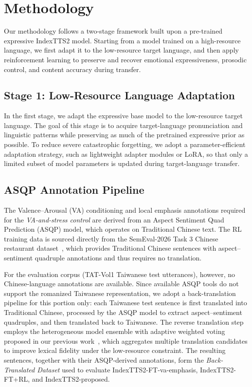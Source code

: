 \section{Methodology}
\label{section:algorithm}

Our methodology follows a two-stage framework built upon a pre-trained expressive IndexTTS2 model. Starting from a model trained on a high-resource language, we first adapt it to the low-resource target language, and then apply reinforcement learning to preserve and recover emotional expressiveness, prosodic control, and content accuracy during transfer.

\subsection{Stage 1: Low-Resource Language Adaptation}
In the first stage, we adapt the expressive base model to the low-resource target language. The goal of this stage is to acquire target-language pronunciation and linguistic patterns while preserving as much of the pretrained expressive prior as possible. To reduce severe catastrophic forgetting, we adopt a parameter-efficient adaptation strategy, such as lightweight adapter modules or LoRA, so that only a limited subset of model parameters is updated during target-language transfer.

\subsection{ASQP Annotation Pipeline}
\label{section:algorithm:backtranslation}
The Valence--Arousal (VA) conditioning and local emphasis annotations required for the \emph{VA-and-stress control} are derived from an Aspect Sentiment Quad Prediction (ASQP) model, which operates on Traditional Chinese text. The RL training data is sourced directly from the SemEval-2026 Task 3 Chinese restaurant dataset~\citep{DimABSA2026}, which provides Traditional Chinese sentences with aspect--sentiment quadruple annotations and thus requires no translation.

For the evaluation corpus (TAT-Vol1 Taiwanese test utterances), however, no Chinese-language annotations are available. Since available ASQP tools do not support the romanized Taiwanese representation, we adopt a back-translation pipeline for this portion only: each Taiwanese test sentence is first translated into Traditional Chinese, processed by the ASQP model to extract aspect--sentiment quadruples, and then translated back to Taiwanese. The reverse translation step employs the heterogeneous model ensemble with adaptive weighted voting proposed in our previous work~\citep{Hsieh2026NYCU}, which aggregates multiple translation candidates to improve lexical fidelity under the low-resource constraint. The resulting sentences, together with their ASQP-derived annotations, form the \textit{Back-Translated Dataset} used to evaluate IndexTTS2-FT-va-emphasis, IndexTTS2-FT+RL, and IndexTTS2-proposed.

